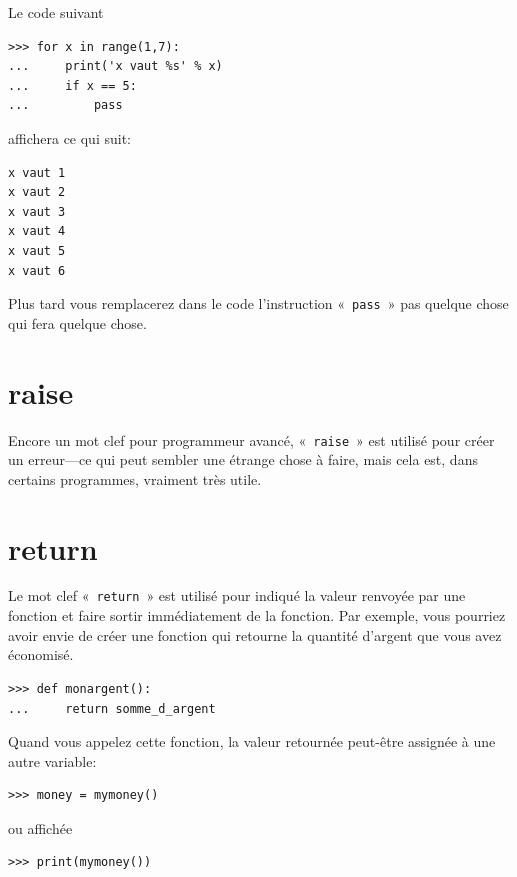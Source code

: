 Le code suivant
\begin{Verbatim}[frame=single,rulecolor=\color{gray}]
>>> for x in range(1,7):
...     print('x vaut %s' % x)
...     if x == 5:
...         pass
\end{Verbatim}

affichera ce qui suit:


\begin{Verbatim}[frame=single,rulecolor=\color{gray}]
x vaut 1
x vaut 2
x vaut 3
x vaut 4
x vaut 5
x vaut 6
\end{Verbatim}

Plus tard vous remplacerez dans le code l'instruction « \texttt{pass} » pas quelque chose qui fera quelque chose.



\section*{raise}

Encore un mot clef pour programmeur avancé, « \texttt{raise} » est utilisé pour créer un erreur---ce qui peut sembler une étrange chose à faire, mais cela est, dans certains programmes, vraiment très utile.

\section*{return}
Le mot clef « \texttt{return} » est utilisé pour indiqué la valeur renvoyée par une fonction et faire sortir immédiatement de la fonction. Par exemple, vous pourriez avoir envie de créer une fonction qui retourne la quantité d'argent que vous avez économisé.


\begin{Verbatim}[frame=single,rulecolor=\color{gray}]
>>> def monargent():
...     return somme_d_argent
\end{Verbatim}

Quand vous appelez cette fonction, la valeur retournée peut-être assignée à une autre variable:
\begin{Verbatim}[frame=single,rulecolor=\color{gray}]
>>> money = mymoney()
\end{Verbatim}

ou affichée

\begin{Verbatim}[frame=single,rulecolor=\color{gray}]
>>> print(mymoney())
\end{Verbatim}

